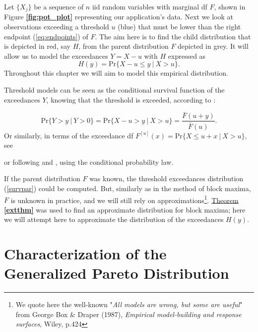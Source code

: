 Let $\{X_j\}$ be a sequence of $n$ iid random variables with marginal df $F$, shown in Figure \textbf{\ref{fig:pot_plot}} representing our application's data. Next we look at observations exceeding a threshold $u$ (blue) that must be lower than the right endpoint (\ref{eq:endpoints}) of $F$. The aim here is to find the child distribution that is depicted in red, say $H$, from the parent distribution $F$ depicted in grey. It will allow us to model the exceedances $Y=X-u$ with $H$ expressed as \begin{equation*}
H(y)=\text{Pr}\{X-u\leq y \ | \ X>u\}.
\end{equation*}
Throughout this chapter we will aim to model this empirical distribution.

Threshold models can be seen as the conditional survival function of the exceedances $Y$, knowing that the threshold is exceeded, according to \citet[pp.147]{beirlant_statistics_2006} :


\begin{equation}\label{survpar}
\text{Pr}\big\{Y>y\ |\ Y>0\big\}=\text{Pr}\big\{X-u>y\ |\ X>u\big\}=\frac{\bar{F}(u+y)}{\bar{F}(u)}.
\end{equation}
Or similarly, in terms of the exceedance df $F^{[u]}(x)=\text{Pr}\{X\leq u+x \ | \ X>u\}$, see \citet[pp.25-29]{reiss_statistical_2007}

or following \citet{charras_extreme_2013} and \citet{rosso_extreme_2015}, using the conditional probability law. %

If the parent distribution $F$ was known, the threshold exceedances distribution (\ref{survpar}) could be computed. But, similarly as in the method of block maxima, $F$ is unknown in practice, and we will still rely on approximations\footnote{We quote here the well-known "\textit{All models are wrong, but some are useful}" from George Box \& Draper (1987), \textit{Empirical model-building and response surfaces}, Wiley, p.424}. \hyperref[extthm]{Theorem \textbf{\ref{extthm}}} was used to find an approximate distribution for block maxima; here we will attempt here to approximate the distribution of the exceedances $H(y)$.


\section{Characterization of the Generalized Pareto Distribution}\label{sec:charac_gpd}


